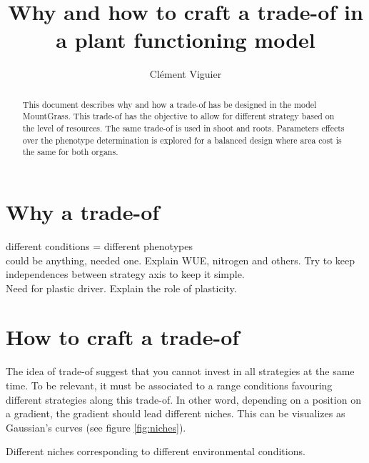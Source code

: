 \documentclass[a4paper, justified,marginals=raggedright]{tufte-handout}
\title{Why and how to craft a trade-of in a plant functioning model}
\author{Clément Viguier}
\begin{document}
\maketitle
\begin{fullwidth}
\begin{abstract}
\noindent
This document describes why and how a trade-of has be designed in the model MountGrass. This trade-of has the objective to allow for different strategy based on the level of resources. The same trade-of is used in shoot and roots. Parameters effects over the phenotype determination is explored for a balanced design where area cost is the same for both organs.
\end{abstract}
\end{fullwidth}

\section{Why a trade-of}
different conditions = different phenotypes\\
could be anything, needed one. Explain WUE, nitrogen and others. Try to keep independences between strategy axis to keep it simple.\\
Need for plastic driver. Explain the role of plasticity.

\section{How to craft a trade-of}

\indent The idea of trade-of suggest that you cannot invest in all strategies at the same time. To be relevant, it must be associated to a range conditions favouring different strategies along this trade-of. In other word, depending on a position on a gradient, the gradient should lead different niches. This can be visualizes as Gaussian's curves (see figure \ref{fig:niches}).

\begin{marginfigure}[-30mm]
\label{fig:niches}
\caption{Different niches corresponding to different environmental conditions.}
\end{marginfigure}
\end{document}
